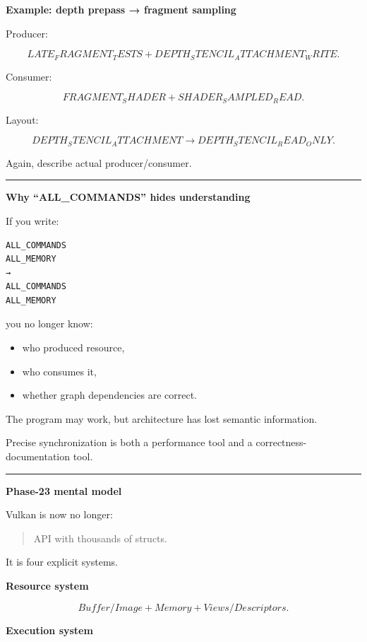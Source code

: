 \textbf{Example: depth prepass → fragment sampling}

Producer:

\[
LATE_FRAGMENT_TESTS
+
DEPTH_STENCIL_ATTACHMENT_WRITE.
\]

Consumer:

\[
FRAGMENT_SHADER
+
SHADER_SAMPLED_READ.
\]

Layout:

\[
DEPTH_STENCIL_ATTACHMENT
\rightarrow
DEPTH_STENCIL_READ_ONLY.
\]

Again, describe actual producer/consumer.

\begin{center}\rule{0.5\linewidth}{0.5pt}\end{center}

\textbf{Why ``ALL\_COMMANDS'' hides understanding}

If you write:

\begin{verbatim}
ALL_COMMANDS
ALL_MEMORY
→
ALL_COMMANDS
ALL_MEMORY
\end{verbatim}

you no longer know:

\begin{itemize}
\tightlist
\item
  who produced resource,
\item
  who consumes it,
\item
  whether graph dependencies are correct.
\end{itemize}

The program may work, but architecture has lost semantic information.

Precise synchronization is both a performance tool and a correctness-documentation tool.

\begin{center}\rule{0.5\linewidth}{0.5pt}\end{center}

\textbf{Phase-23 mental model}

Vulkan is now no longer:

\begin{quote}
API with thousands of structs.
\end{quote}

It is four explicit systems.

\textbf{Resource system}

\[
Buffer/Image
+
Memory
+
Views/Descriptors.
\]

\textbf{Execution system}

